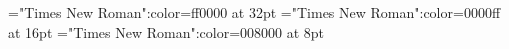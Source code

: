 \documentclass[a4paper]{article}
\begin{document}
 
\pagestyle{plain} 
\font\ta="Times New Roman":color=ff0000 at 32pt
\font\tbta="Times New Roman":color=0000ff at 16pt
\font\tctbta="Times New Roman":color=008000 at 8pt

\pagestyle{fancy} 

\end{document}
